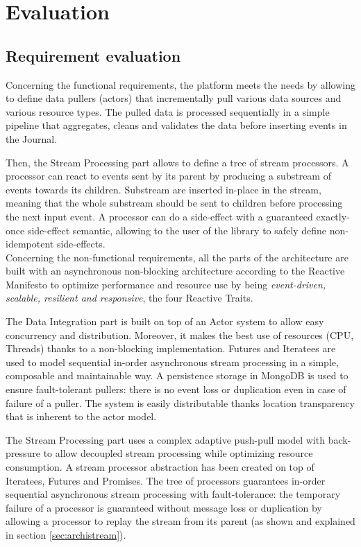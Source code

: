 \chapter{Evaluation}

\section{Requirement evaluation}

Concerning the functional requirements, the platform meets the needs by allowing to define data pullers (actors) that incrementally pull various data sources and various resource types.
The pulled data is processed sequentially in a simple pipeline that aggregates, cleans and validates the data before inserting events in the Journal.

Then, the Stream Processing part allows to define a tree of stream processors. A processor can react to events sent by its parent by producing a substream of events towards its children. Substream are inserted in-place in the stream, meaning that the whole substream should be sent to children before processing the next input event. A processor can do a side-effect with a guaranteed exactly-once side-effect semantic, allowing to the user of the library to safely define non-idempotent side-effects.
\\

Concerning the non-functional requirements, all the parts of the architecture are built with an asynchronous non-blocking architecture according to the Reactive Manifesto 
 to optimize performance and resource use by being \textit{event-driven, scalable, resilient and responsive}, the four Reactive Traits.

The Data Integration part is built on top of an Actor system to allow easy concurrency and distribution. Moreover, it makes the best use of resources (CPU, Threads) thanks to a non-blocking implementation. Futures and Iteratees are used to model sequential in-order asynchronous stream processing in a simple, composable and maintainable way. A persistence storage
in MongoDB is used to ensure fault-tolerant pullers: there is no event loss or duplication even in case of failure of a puller. The system is easily distributable 
thanks location transparency that is inherent to the actor model.

The Stream Processing part uses a complex adaptive push-pull model with back-pressure to allow decoupled stream processing while optimizing resource consumption. A stream processor abstraction has been created on top of Iteratees, Futures and Promises. The tree of processors guarantees in-order sequential asynchronous stream processing with fault-tolerance: the temporary failure of a processor is guaranteed without message loss or duplication by allowing a processor to replay the stream from its parent (as shown and explained in section 
\ref{sec:archistream}).


